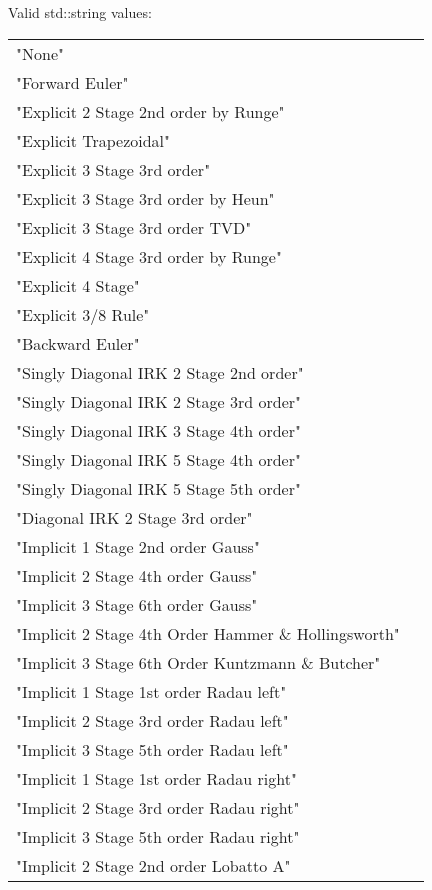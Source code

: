 \begin{list}{}
\begin{description}
  Valid std::string values:

      \begin{tabular}{lp{}}
      "None" & \\ 
      "Forward Euler" & \\ 
      "Explicit 2 Stage 2nd order by Runge" & \\ 
      "Explicit Trapezoidal" & \\ 
      "Explicit 3 Stage 3rd order" & \\ 
      "Explicit 3 Stage 3rd order by Heun" & \\ 
      "Explicit 3 Stage 3rd order TVD" & \\ 
      "Explicit 4 Stage 3rd order by Runge" & \\ 
      "Explicit 4 Stage" & \\ 
      "Explicit 3/8 Rule" & \\ 
      "Backward Euler" & \\ 
      "Singly Diagonal IRK 2 Stage 2nd order" & \\ 
      "Singly Diagonal IRK 2 Stage 3rd order" & \\ 
      "Singly Diagonal IRK 3 Stage 4th order" & \\ 
      "Singly Diagonal IRK 5 Stage 4th order" & \\ 
      "Singly Diagonal IRK 5 Stage 5th order" & \\ 
      "Diagonal IRK 2 Stage 3rd order" & \\ 
      "Implicit 1 Stage 2nd order Gauss" & \\ 
      "Implicit 2 Stage 4th order Gauss" & \\ 
      "Implicit 3 Stage 6th order Gauss" & \\ 
      "Implicit 2 Stage 4th Order Hammer \& Hollingsworth" & \\ 
      "Implicit 3 Stage 6th Order Kuntzmann \& Butcher" & \\ 
      "Implicit 1 Stage 1st order Radau left" & \\ 
      "Implicit 2 Stage 3rd order Radau left" & \\ 
      "Implicit 3 Stage 5th order Radau left" & \\ 
      "Implicit 1 Stage 1st order Radau right" & \\ 
      "Implicit 2 Stage 3rd order Radau right" & \\ 
      "Implicit 3 Stage 5th order Radau right" & \\ 
      "Implicit 2 Stage 2nd order Lobatto A" & \\ 

\end{tabular}
\end{description}
\end{list}
